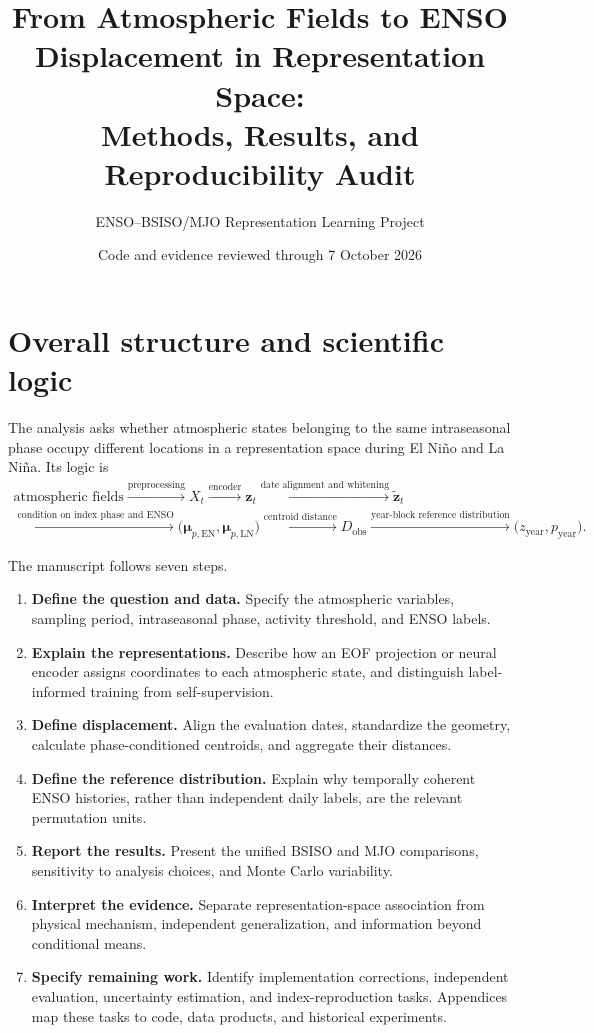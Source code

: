 \documentclass[11pt]{article}
\title{From Atmospheric Fields to ENSO Displacement in Representation Space:\\Methods, Results, and Reproducibility Audit}
\author{ENSO--BSISO/MJO Representation Learning Project}
\date{Code and evidence reviewed through 7 October 2026}
\newcommand{\EN}{\mathrm{EN}}
\newcommand{\LN}{\mathrm{LN}}
\begin{document}
\maketitle

\section*{Overall structure and scientific logic}

The analysis asks whether atmospheric states belonging to the same intraseasonal phase occupy different locations in a representation space during El Ni\~no and La Ni\~na. Its logic is
\begin{equation*}
\begin{gathered}
\text{atmospheric fields}
\xrightarrow{\text{preprocessing}}
X_t
\xrightarrow{\text{encoder}}
\mathbf z_t
\xrightarrow{\text{date alignment and whitening}}
\widetilde{\mathbf z}_t
\\
\xrightarrow{\text{condition on index phase and ENSO}}
\bigl(\boldsymbol\mu_{p,\EN},\boldsymbol\mu_{p,\LN}\bigr)
\xrightarrow{\text{centroid distance}}
D_{\mathrm{obs}}
\xrightarrow{\text{year-block reference distribution}}
\bigl(z_{\mathrm{year}},p_{\mathrm{year}}\bigr).
\end{gathered}
\end{equation*}

The manuscript follows seven steps.
\begin{enumerate}
\item \textbf{Define the question and data.} Specify the atmospheric variables, sampling period, intraseasonal phase, activity threshold, and ENSO labels.
\item \textbf{Explain the representations.} Describe how an EOF projection or neural encoder assigns coordinates to each atmospheric state, and distinguish label-informed training from self-supervision.
\item \textbf{Define displacement.} Align the evaluation dates, standardize the geometry, calculate phase-conditioned centroids, and aggregate their distances.
\item \textbf{Define the reference distribution.} Explain why temporally coherent ENSO histories, rather than independent daily labels, are the relevant permutation units.
\item \textbf{Report the results.} Present the unified BSISO and MJO comparisons, sensitivity to analysis choices, and Monte Carlo variability.
\item \textbf{Interpret the evidence.} Separate representation-space association from physical mechanism, independent generalization, and information beyond conditional means.
\item \textbf{Specify remaining work.} Identify implementation corrections, independent evaluation, uncertainty estimation, and index-reproduction tasks. Appendices map these tasks to code, data products, and historical experiments.
\end{enumerate}
\end{document}
